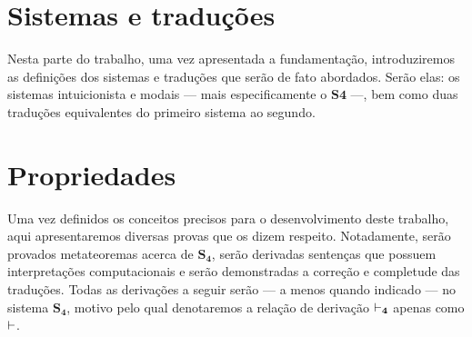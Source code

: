     
    
    

    \chapter{Sistemas e traduções}

        Nesta parte do trabalho, uma vez apresentada a fundamentação, introduziremos as definições dos sistemas e traduções que serão de fato abordados. Serão elas: os sistemas intuicionista  e modais --- mais especificamente o $\mathbf{S4}$ ---, bem como duas traduções equivalentes do primeiro sistema ao segundo.

        
        
        

    \chapter{Propriedades}
        Uma vez definidos os conceitos precisos para o desenvolvimento deste trabalho, aqui apresentaremos diversas provas que os dizem respeito. Notadamente, serão provados metateoremas acerca de $\mathbf{S_4}$, serão derivadas sentenças que possuem interpretações computacionais e serão demonstradas a correção e completude das traduções. Todas as derivações a seguir serão --- a menos quando indicado --- no sistema $\mathbf{S_4}$, motivo pelo qual denotaremos a relação de derivação $\mathrel{\vdash}_{\mathbf{4}}$ apenas como $\mathrel{\vdash}$.

        
        
        
        

    
    

